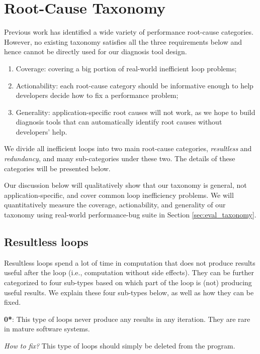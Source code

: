 \section{Root-Cause Taxonomy}
\label{sec:study}

Previous work has identified a wide variety of performance root-cause 
categories. However, no existing taxonomy satisfies all the three 
requirements below and hence cannot be directly used for our diagnosis tool
design.
\begin{enumerate}
\item Coverage: covering
a big portion of real-world inefficient loop problems; 
\item Actionability: each root-cause category should be informative enough 
to help developers
decide how to fix a performance problem; 
\item Generality: application-specific root causes will not work, as we
hope to build diagnosis tools that can automatically identify root causes 
without developers' help.
\end{enumerate}


We divide all inefficient loops into two main root-cause categories,
\textit{resultless} and \textit{redundancy}, and many sub-categories under
these two.
The details of these categories will be presented below.

Our discussion below will qualitatively show that 
our taxonomy is general, not application-specific, and
cover common loop inefficiency problems.
We will quantitatively measure the coverage, actionability, and 
generality of our taxonomy
using real-world performance-bug suite in Section \ref{sec:eval_taxonomy}.


\subsection{Resultless loops}
\label{sec:study_resultless}
Resultless loops spend a lot of time in computation that does not
produce results useful after the loop (i.e., computation without side effects).
They can be further categorized to four sub-types 
based on which part of the loop is
(not) producing useful results. We explain these four sub-types below, 
as well as
how they can be fixed.


{\textbf{0*}}: 
This type of loops never produce any results in any iteration.
They are rare in mature software systems.

{\textit{How to fix?}} This type of loops should simply be deleted from the program.

